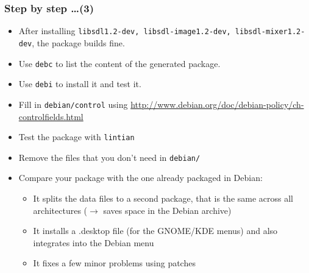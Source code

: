 \documentclass[10pt,final]{beamer}
\begin{document}
\begin{frame}
\frametitle{Step by step \ldots (3)}
\begin{itemize}
	\item After installing \texttt{libsdl1.2-dev, libsdl-image1.2-dev, libsdl-mixer1.2-dev}, the package builds fine.
		\hbr
	\item Use \texttt{debc} to list the content of the generated package.
		\hbr
	\item Use \texttt{debi} to install it and test it.
		\hbr
	\item Fill in \texttt{debian/control} using \url{http://www.debian.org/doc/debian-policy/ch-controlfields.html}
		\hbr
	\item Test the package with \texttt{lintian}
		\hbr
	\item Remove the files that you don't need in \texttt{debian/}
		\hbr
	\item Compare your package with the one already packaged in Debian:
		\begin{itemize}
			\item It splits the data files to a second package, that is the same across all architectures ($\rightarrow$ saves space in the Debian archive)
			\item It installs a .desktop file (for the GNOME/KDE menus) and also integrates into the Debian menu
			\item It fixes a few minor problems using patches
		\end{itemize}
\end{itemize}
\end{frame}
\end{document}
